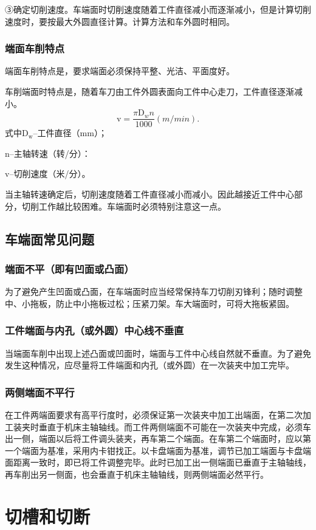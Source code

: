 \documentclass{ctexbook}
\begin{document}
③确定切削速度。车端面时切削速度随着工件直径减小而逐渐减小，但是计算切削速度时，要按最大外圆直径计算。计算方法和车外圆时相同。
\subsubsection{端面车削特点}
端面车削特点是，要求端面必须保持平整、光洁、平面度好。

车削端面时特点是，随着车刀由工件外圆表面向工件中心走刀，工件直径逐渐减小。
\begin{equation*}
	\text{v}=\frac{\pi \text{D$_w$}n}{1000} (m/min).
\end{equation*}
式中D$_{\text{w}}$--工件直径（mm）；

n--主轴转速（转/分）：

v--切削速度（米/分）。

当主轴转速确定后，切削速度随着工件直径减小而减小。因此越接近工件中心部分，切削工作越比较困难。车端面时必须特别注意这一点。
\subsection{车端面常见问题}
\subsubsection{端面不平（即有凹面或凸面）}
为了避免产生凹面或凸面，在车端面时应当经常保持车刀切削刃锋利；随时调整中、小拖板，防止中小拖板过松；压紧刀架。车大端面时，可将大拖板紧固。
\subsubsection{工件端面与内孔（或外圆）中心线不垂直}
当端面车削中出现上述凸面或凹面时，端面与工件中心线自然就不垂直。为了避免发生这种情况，应尽量将工件端面和内孔（或外圆）在一次装夹中加工完毕。
\subsubsection{两侧端面不平行}
在工件两端面要求有高平行度时，必须保证第一次装夹中加工出端面，在第二次加工装夹时垂直于机床主轴轴线。而工件两侧端面不可能在一次装夹中完成，必须车出一侧，端面以后将工件调头装夹，再车第二个端面。在车第二个端面时，应以第一个端面为基准，采用内卡钳找正。以卡盘端面为基准，调节已加工端面与卡盘端面距离一致时，即已将工件调整完毕。此时已加工出一侧端面已垂直于主轴轴线，再车削出另一侧面，也会垂直于机床主轴轴线，则两侧端面必然平行。
\section{切槽和切断}
\end{document}

